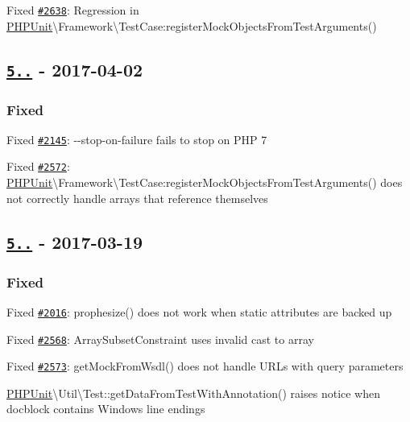 \begin{DoxyItemize}
\item Fixed \href{https://github.com/sebastianbergmann/phpunit/pull/2638}{\tt \#2638}\+: Regression in {\ttfamily \mbox{\hyperlink{namespace_p_h_p_unit}{P\+H\+P\+Unit}}\textbackslash{}Framework\textbackslash{}Test\+Case\+:register\+Mock\+Objects\+From\+Test\+Arguments()}
\end{DoxyItemize}

\subsection*{\href{https://github.com/sebastianbergmann/phpunit/compare/5.7.17...5.7.18}{\tt 5..} -\/ 2017-\/04-\/02}

\subsubsection*{Fixed}


\begin{DoxyItemize}
\item Fixed \href{https://github.com/sebastianbergmann/phpunit/issues/2145}{\tt \#2145}\+: {\ttfamily -\/-\/stop-\/on-\/failure} fails to stop on P\+HP 7
\item Fixed \href{https://github.com/sebastianbergmann/phpunit/issues/2572}{\tt \#2572}\+: {\ttfamily \mbox{\hyperlink{namespace_p_h_p_unit}{P\+H\+P\+Unit}}\textbackslash{}Framework\textbackslash{}Test\+Case\+:register\+Mock\+Objects\+From\+Test\+Arguments()} does not correctly handle arrays that reference themselves
\end{DoxyItemize}

\subsection*{\href{https://github.com/sebastianbergmann/phpunit/compare/5.7.16...5.7.17}{\tt 5..} -\/ 2017-\/03-\/19}

\subsubsection*{Fixed}


\begin{DoxyItemize}
\item Fixed \href{https://github.com/sebastianbergmann/phpunit/issues/2016}{\tt \#2016}\+: {\ttfamily prophesize()} does not work when static attributes are backed up
\item Fixed \href{https://github.com/sebastianbergmann/phpunit/issues/2568}{\tt \#2568}\+: {\ttfamily Array\+Subset\+Constraint} uses invalid cast to array
\item Fixed \href{https://github.com/sebastianbergmann/phpunit/issues/2573}{\tt \#2573}\+: {\ttfamily get\+Mock\+From\+Wsdl()} does not handle U\+R\+Ls with query parameters
\item {\ttfamily \mbox{\hyperlink{namespace_p_h_p_unit}{P\+H\+P\+Unit}}\textbackslash{}Util\textbackslash{}Test\+::get\+Data\+From\+Test\+With\+Annotation()} raises notice when docblock contains Windows line endings
\end{DoxyItemize}

